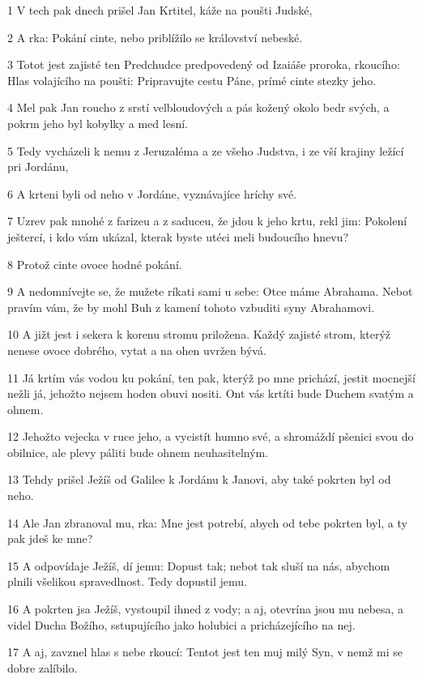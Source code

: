 \par 1 V tech pak dnech prišel Jan Krtitel, káže na poušti Judské,
\par 2 A rka: Pokání cinte, nebo priblížilo se království nebeské.
\par 3 Totot jest zajisté ten Predchudce predpovedený od Izaiáše proroka, rkoucího: Hlas volajícího na poušti: Pripravujte cestu Páne, prímé cinte stezky jeho.
\par 4 Mel pak Jan roucho z srstí velbloudových a pás kožený okolo bedr svých, a pokrm jeho byl kobylky a med lesní.
\par 5 Tedy vycházeli k nemu z Jeruzaléma a ze všeho Judstva, i ze vší krajiny ležící pri Jordánu,
\par 6 A krteni byli od neho v Jordáne, vyznávajíce hríchy své.
\par 7 Uzrev pak mnohé z farizeu a z saduceu, že jdou k jeho krtu, rekl jim: Pokolení ještercí, i kdo vám ukázal, kterak byste utéci meli budoucího hnevu?
\par 8 Protož cinte ovoce hodné pokání.
\par 9 A nedomnívejte se, že mužete ríkati sami u sebe: Otce máme Abrahama. Nebot pravím vám, že by mohl Buh z kamení tohoto vzbuditi syny Abrahamovi.
\par 10 A jižt jest i sekera k korenu stromu priložena. Každý zajisté strom, kterýž nenese ovoce dobrého, vytat a na ohen uvržen bývá.
\par 11 Já krtím vás vodou ku pokání, ten pak, kterýž po mne prichází, jestit mocnejší nežli já, jehožto nejsem hoden obuvi nositi. Ont vás krtíti bude Duchem svatým a ohnem.
\par 12 Jehožto vejecka v ruce jeho, a vycistít humno své, a shromáždí pšenici svou do obilnice, ale plevy páliti bude ohnem neuhasitelným.
\par 13 Tehdy prišel Ježíš od Galilee k Jordánu k Janovi, aby také pokrten byl od neho.
\par 14 Ale Jan zbranoval mu, rka: Mne jest potrebí, abych od tebe pokrten byl, a ty pak jdeš ke mne?
\par 15 A odpovídaje Ježíš, dí jemu: Dopust tak; nebot tak sluší na nás, abychom plnili všelikou spravedlnost. Tedy dopustil jemu.
\par 16 A pokrten jsa Ježíš, vystoupil ihned z vody; a aj, otevrína jsou mu nebesa, a videl Ducha Božího, sstupujícího jako holubici a pricházejícího na nej.
\par 17 A aj, zavznel hlas s nebe rkoucí: Tentot jest ten muj milý Syn, v nemž mi se dobre zalíbilo.

